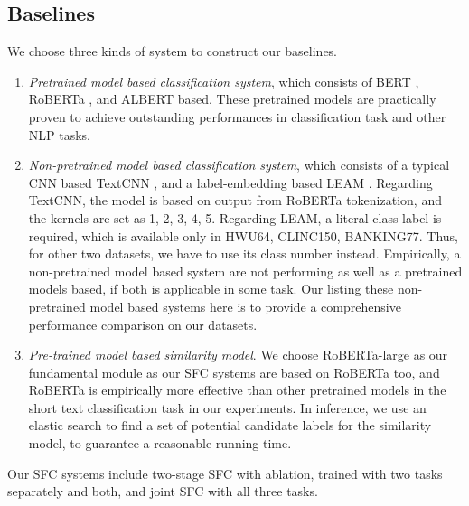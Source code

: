 \subsection{Baselines}
We choose three kinds of system to construct our baselines.

\begin{enumerate}
  \item \emph{Pretrained model based classification system}, which consists of
  BERT \cite{devlin2018bert},  RoBERTa \cite{liu2019roberta},  and  ALBERT  \cite{lan2019albert}  based.  These pretrained
  models  are  practically  proven  to  achieve  outstanding  performances  in
  classification task and other NLP tasks.

  \item   \emph{Non-pretrained   model  based  classification  system},  which
  consists  of  a typical CNN based TextCNN \cite{kim2014convolutional}, and a
  label-embedding based LEAM \cite{wang2018joint}. Regarding TextCNN, the
  model is based on output from RoBERTa tokenization, and the kernels are set
  as 1, 2, 3, 4, 5. Regarding LEAM, a literal class label is required, which
  is available only in HWU64, CLINC150, BANKING77. Thus, for other two
  datasets, we have to use its class number instead.  Empirically,
  a  non-pretrained  model  based  system  are  not  performing  as  well as a
  pretrained  models  based,  if  both is applicable in some task. Our listing
  these  non-pretrained model based systems here is to provide a comprehensive
  performance comparison on our datasets.

  \item   \emph{Pre-trained   model   based   similarity   model}.  We  choose
  RoBERTa-large  as  our  fundamental  module as our SFC systems are based on
  RoBERTa  too, and RoBERTa is empirically more effective than other pretrained
  models  in  the  short  text  classification  task  in  our  experiments. In
  inference,  we  use  an  elastic search to find a set of potential candidate
  labels for the similarity model, to guarantee a reasonable running time.
\end{enumerate}

Our SFC systems include two-stage SFC with ablation, trained with two tasks
separately and both, and joint SFC with all three tasks.

